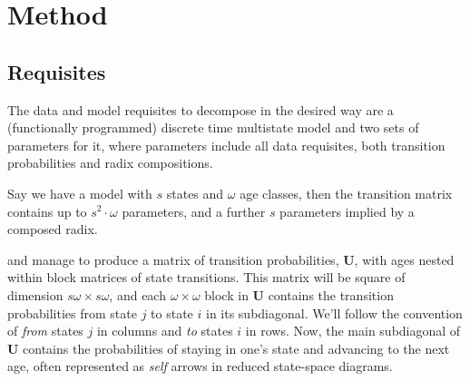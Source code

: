 \documentclass[12pt]{article}
\begin{document}
\section{Method}
\subsection{Requisites}
The data and model requisites to decompose in the desired way are a (functionally programmed) discrete time multistate model and two sets of parameters for it, where parameters include all data requisites, both transition probabilities and radix compositions.

Say we have a model with $s$ states and $\omega$ age classes, then the transition matrix contains up to $s^2\cdot\omega$ parameters, and a further $s$ parameters implied by a composed radix.


and manage to produce a matrix of transition probabilities, $\textbf{U}$, with ages nested within block matrices of state transitions. This matrix will be square of dimension $s\omega \times s\omega$, and each $\omega \times \omega$ block in $\textbf{U}$ contains the transition probabilities from state $j$ to state $i$ in its subdiagonal. We'll follow the convention of \emph{from} states $j$ in columns and \emph{to} states $i$ in rows. Now,
the main subdiagonal of $\textbf{U}$ contains the probabilities of staying in one's state and advancing to the next age, often represented as \emph{self} arrows in reduced state-space diagrams. 
\end{document}
